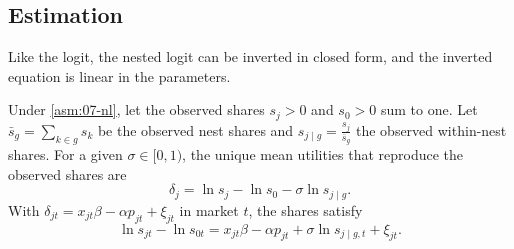 \subsection{Estimation}\label{sec:07-nl-estimation}

Like the logit, the nested logit can be inverted in closed form, and the inverted equation is linear in the
parameters.

\begin{proposition}\label{prop:07-nl-inversion}
Under \cref{asm:07-nl}, let the observed shares $s_j > 0$ and $s_0 > 0$ sum to one. Let
$\bar s_g = \sum_{k\in g}s_k$ be the observed nest shares and $s_{j \mid g} = \frac{s_j}{\bar s_g}$ the observed
within-nest shares. For a given $\sigma \in [0, 1)$, the unique mean utilities that reproduce the observed shares
are
\begin{equation}\label{eq:07-nl-delta}
\delta_j = \ln s_j - \ln s_0 - \sigma\ln s_{j \mid g} .
\end{equation}
With $\delta_{jt} = x_{jt}\beta - \alpha p_{jt} + \xi_{jt}$ in market $t$, the shares satisfy
\begin{equation}\label{eq:07-nl-regression}
\ln s_{jt} - \ln s_{0t} = x_{jt}\beta - \alpha p_{jt} + \sigma\ln s_{j \mid g, t} + \xi_{jt} .
\end{equation}
\end{proposition}

